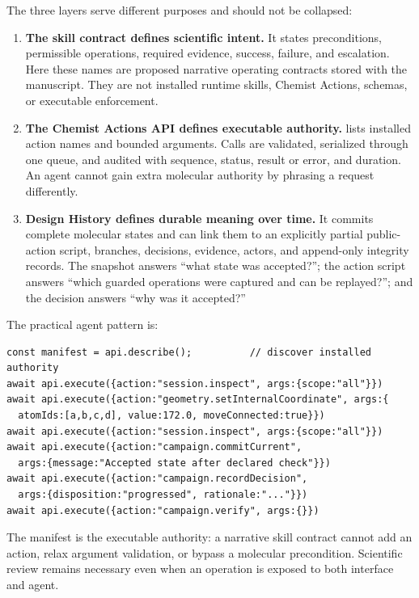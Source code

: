 \documentclass[11pt]{article}
\begin{document}
The three layers serve different purposes and should not be collapsed:

\begin{enumerate}
\item \textbf{The skill contract defines scientific intent.} It states preconditions, permissible operations, required evidence, success, failure, and escalation. Here these names are proposed narrative operating contracts stored with the manuscript. They are not installed runtime skills, Chemist Actions, schemas, or executable enforcement.
\item \textbf{The Chemist Actions API defines executable authority.}  lists installed action names and bounded arguments. Calls are validated, serialized through one queue, and audited with sequence, status, result or error, and duration. An agent cannot gain extra molecular authority by phrasing a request differently.
\item \textbf{Design History defines durable meaning over time.} It commits complete molecular states and can link them to an explicitly partial public-action script, branches, decisions, evidence, actors, and append-only integrity records. The snapshot answers ``what state was accepted?''; the action script answers ``which guarded operations were captured and can be replayed?''; and the decision answers ``why was it accepted?''
\end{enumerate}

The practical agent pattern is:

\begin{lstlisting}
const manifest = api.describe();          // discover installed authority
await api.execute({action:"session.inspect", args:{scope:"all"}})
await api.execute({action:"geometry.setInternalCoordinate", args:{
  atomIds:[a,b,c,d], value:172.0, moveConnected:true}})
await api.execute({action:"session.inspect", args:{scope:"all"}})
await api.execute({action:"campaign.commitCurrent",
  args:{message:"Accepted state after declared check"}})
await api.execute({action:"campaign.recordDecision",
  args:{disposition:"progressed", rationale:"..."}})
await api.execute({action:"campaign.verify", args:{}})
\end{lstlisting}

The manifest is the executable authority: a narrative skill contract cannot add an action, relax argument validation, or bypass a molecular precondition. Scientific review remains necessary even when an operation is exposed to both interface and agent.
\end{document}
